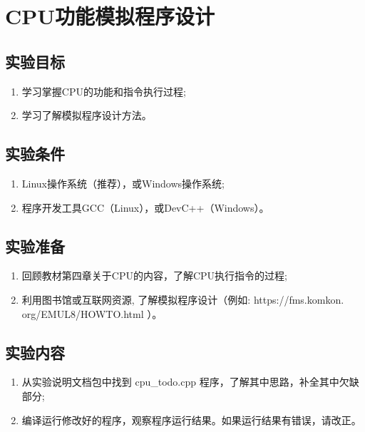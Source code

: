 
\chapter{CPU功能模拟程序设计}

\section{实验目标}

\begin{enumerate}
	\item 学习掌握CPU的功能和指令执行过程;
	\item 学习了解模拟程序设计方法。
\end{enumerate}

\section{实验条件}

\begin{enumerate}
	\item Linux操作系统（推荐），或Windows操作系统;
	\item 程序开发工具GCC（Linux），或DevC++（Windows）。
\end{enumerate}

\section{实验准备}

\begin{enumerate}
	\item 回顾教材第四章关于CPU的内容，了解CPU执行指令的过程;
	\item 利用图书馆或互联网资源, 了解模拟程序设计（例如: https://fms.komkon.
		org/EMUL8/HOWTO.html ）。
\end{enumerate}

\section{实验内容}

\begin{enumerate}
	\item 从实验说明文档包中找到 cpu\_todo.cpp 程序，了解其中思路，补全其中欠缺部分;
	\item 编译运行修改好的程序，观察程序运行结果。如果运行结果有错误，请改正。
\end{enumerate}

